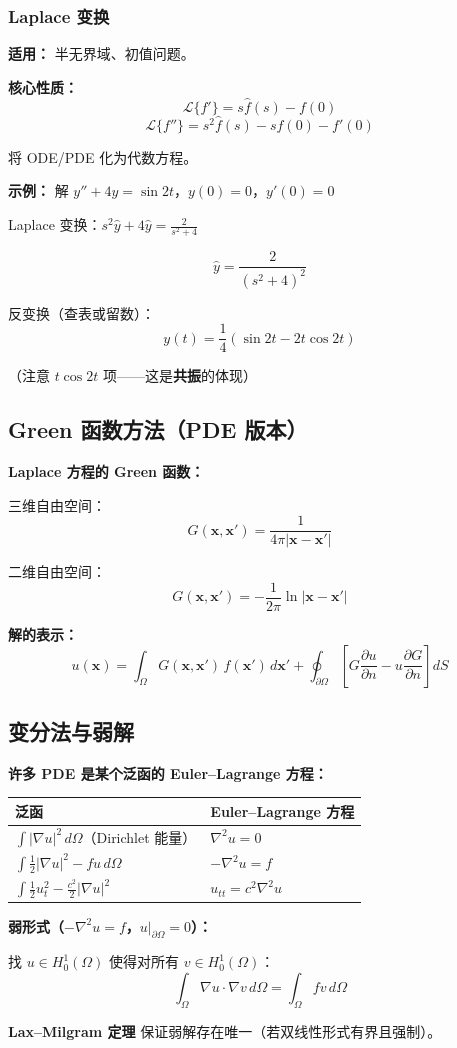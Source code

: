 \subsubsection{Laplace 变换}

\textbf{适用：} 半无界域、初值问题。

\textbf{核心性质：}
\[
\mathcal{L}\{f'\} = s\hat{f}(s) - f(0)
\]
\[
\mathcal{L}\{f''\} = s^2\hat{f}(s) - sf(0) - f'(0)
\]

将 ODE/PDE 化为代数方程。

\textbf{示例：} 解 $y'' + 4y = \sin 2t$，$y(0) = 0$，$y'(0) = 0$

Laplace 变换：$s^2\hat{y} + 4\hat{y} = \frac{2}{s^2+4}$

\[
\hat{y} = \frac{2}{(s^2+4)^2}
\]

反变换（查表或留数）：
\[
\boxed{y(t) = \frac{1}{4}(\sin 2t - 2t\cos 2t)}
\]

（注意 $t\cos 2t$ 项——这是\textbf{共振}的体现）

\subsection{Green 函数方法（PDE 版本）}

\textbf{Laplace 方程的 Green 函数：}

三维自由空间：
\[
G(\mathbf{x}, \mathbf{x}') = \frac{1}{4\pi|\mathbf{x} - \mathbf{x}'|}
\]

二维自由空间：
\[
G(\mathbf{x}, \mathbf{x}') = -\frac{1}{2\pi}\ln|\mathbf{x} - \mathbf{x}'|
\]

\textbf{解的表示：}
\[
u(\mathbf{x}) = \int_\Omega G(\mathbf{x},\mathbf{x}')\,f(\mathbf{x}')\,d\mathbf{x}' + \oint_{\partial\Omega}\left[G\frac{\partial u}{\partial n} - u\frac{\partial G}{\partial n}\right]dS
\]

\subsection{变分法与弱解}

\textbf{许多 PDE 是某个泛函的 Euler--Lagrange 方程：}

\begin{center}
\begin{tabular}{L{5cm}L{5cm}}
\toprule
\textbf{泛函} & \textbf{Euler--Lagrange 方程} \\
\midrule
$\int |\nabla u|^2\,d\Omega$（Dirichlet 能量） & $\nabla^2 u = 0$ \\
$\int \frac{1}{2}|\nabla u|^2 - fu\,d\Omega$ & $-\nabla^2 u = f$ \\
$\int \frac{1}{2}u_t^2 - \frac{c^2}{2}|\nabla u|^2$ & $u_{tt} = c^2\nabla^2 u$ \\
\bottomrule
\end{tabular}
\end{center}

\textbf{弱形式（$-\nabla^2 u = f$，$u|_{\partial\Omega} = 0$）：}

找 $u \in H_0^1(\Omega)$ 使得对所有 $v \in H_0^1(\Omega)$：
\[
\int_\Omega \nabla u \cdot \nabla v\,d\Omega = \int_\Omega fv\,d\Omega
\]

\textbf{Lax--Milgram 定理} 保证弱解存在唯一（若双线性形式有界且强制）。